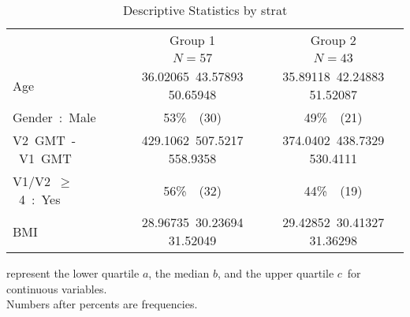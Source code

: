 %
\begin{table}[!tbp]
\caption{Descriptive Statistics by strat\label{sf1}} 
\begin{center}
\begin{tabular}{lcc}
\hline\hline
\multicolumn{1}{l}{}&\multicolumn{1}{c}{Group 1}&\multicolumn{1}{c}{Group 2}\tabularnewline
&\multicolumn{1}{c}{{\scriptsize $N=57$}}&\multicolumn{1}{c}{{\scriptsize $N=43$}}\tabularnewline
\hline
Age&{\scriptsize 36.02065~}{43.57893 }{\scriptsize 50.65948} &{\scriptsize 35.89118~}{42.24883 }{\scriptsize 51.52087} \tabularnewline
Gender~:~Male&53\%~{\scriptsize~(30)}&49\%~{\scriptsize~(21)}\tabularnewline
V2~GMT~-~V1~GMT&{\scriptsize 429.1062~}{507.5217 }{\scriptsize 558.9358} &{\scriptsize 374.0402~}{438.7329 }{\scriptsize 530.4111} \tabularnewline
V1/V2~$\geq$~4~:~Yes&56\%~{\scriptsize~(32)}&44\%~{\scriptsize~(19)}\tabularnewline
BMI&{\scriptsize 28.96735~}{30.23694 }{\scriptsize 31.52049} &{\scriptsize 29.42852~}{30.41327 }{\scriptsize 31.36298} \tabularnewline
\hline
\end{tabular}
\end{center}
 represent the lower quartile $a$, the median $b$, and the upper quartile $c$\ for continuous variables.\\Numbers after percents are frequencies.\end{table}

